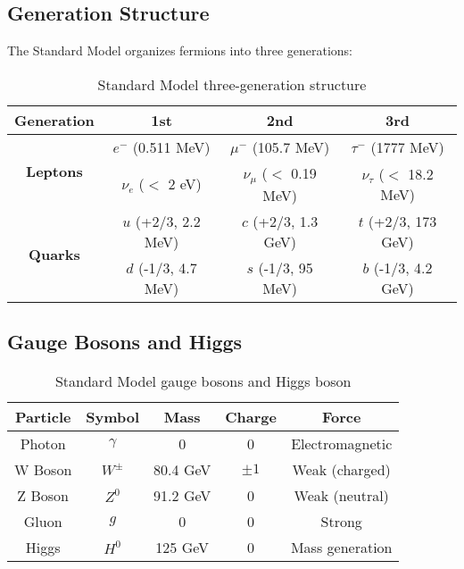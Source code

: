 \documentclass[12pt,a4paper]{article}
\begin{document}
	\subsection{Generation Structure}
	
	The Standard Model organizes fermions into three generations:
	
	\begin{table}[htbp]
		\centering
		\begin{tabular}{|c|c|c|c|}
			\hline
			\textbf{Generation} & \textbf{1st} & \textbf{2nd} & \textbf{3rd} \\
			\hline
			\hline
			\multirow{2}{*}{\textbf{Leptons}} & $e^-$ (0.511 MeV) & $\mu^-$ (105.7 MeV) & $\tau^-$ (1777 MeV) \\
			& $\nu_e$ ($<$ 2 eV) & $\nu_\mu$ ($<$ 0.19 MeV) & $\nu_\tau$ ($<$ 18.2 MeV) \\
			\hline
			\multirow{2}{*}{\textbf{Quarks}} & $u$ (+2/3, 2.2 MeV) & $c$ (+2/3, 1.3 GeV) & $t$ (+2/3, 173 GeV) \\
			& $d$ (-1/3, 4.7 MeV) & $s$ (-1/3, 95 MeV) & $b$ (-1/3, 4.2 GeV) \\
			\hline
		\end{tabular}
		\caption{Standard Model three-generation structure}
		\label{tab:sm_generations}
	\end{table}
	
	\subsection{Gauge Bosons and Higgs}
	
	\begin{table}[htbp]
		\centering
		\begin{tabular}{|c|c|c|c|c|}
			\hline
			\textbf{Particle} & \textbf{Symbol} & \textbf{Mass} & \textbf{Charge} & \textbf{Force} \\
			\hline
			\hline
			Photon & $\gamma$ & 0 & 0 & Electromagnetic \\
			W Boson & $W^{\pm}$ & 80.4 GeV & $\pm 1$ & Weak (charged) \\
			Z Boson & $Z^0$ & 91.2 GeV & 0 & Weak (neutral) \\
			Gluon & $g$ & 0 & 0 & Strong \\
			Higgs & $H^0$ & 125 GeV & 0 & Mass generation \\
			\hline
		\end{tabular}
		\caption{Standard Model gauge bosons and Higgs boson}
		\label{tab:sm_bosons}
	\end{table}
	
\end{document}
